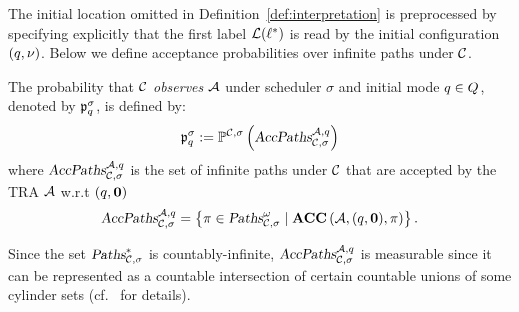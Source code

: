 The initial location omitted in Definition~\ref{def:interpretation} is preprocessed by specifying explicitly that the first label $\mathcal{L}(\ell^*)$ is read by the initial configuration $(q,\nu)$.
Below we define acceptance probabilities over infinite paths under $\mathcal{C}$.
\begin{definition}
The probability that $\mathcal{C}$ \emph{observes} $\mathcal{A}$ under scheduler $\sigma$ and initial mode $q\in Q$, denoted by $\mathfrak{p}_{q}^{\sigma}$, is defined by:
\[
    \mathfrak{p}_{q}^{\sigma}
        :=
            \mathbb{P}^{\mathcal{C},\sigma}\left(
                \mbox{\sl AccPaths} _{\mathcal{C},\sigma} ^{\mathcal{A},q}
            \right)
\]
where $\mbox{\sl AccPaths} _{\mathcal{C},\sigma} ^{\mathcal{A},q}$ is the set of infinite paths under $\mathcal{C}$ that are accepted by the TRA $\mathcal{A}$ w.r.t $(q,\mathbf{0})$
$$
    \mbox{\sl AccPaths} _{\mathcal{C},\sigma} ^{\mathcal{A},q} = \left \{
        \pi \in \mbox{\sl Paths}^\omega_{\mathcal{C},\sigma} \mid
        \mbox{\bf ACC} \left( {\mathcal{A}}, {(q,\mathbf{0})}, {\pi} \right)
    \right\}.
$$
\end{definition}
Since the set $\mbox{\sl Paths}^*_{\mathcal{C},\sigma}$ is countably-infinite,
$\mbox{\sl AccPaths} _{\mathcal{C},\sigma} ^{\mathcal{A},q}$ is measurable since it can be represented as a countable intersection of certain countable unions of some cylinder sets (cf.~\cite[Remark 10.24]{DBLP:books/daglib/0020348} for details).
